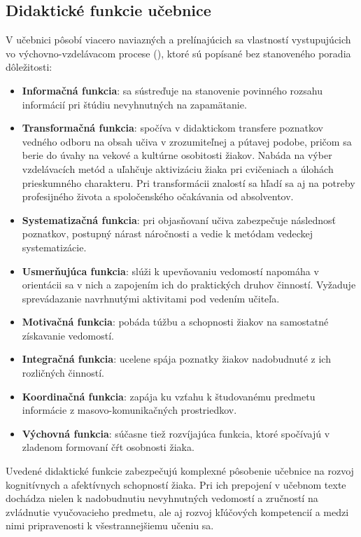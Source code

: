 \subsection{Didaktické funkcie učebnice}
V učebnici pôsobí viacero naviazných a prelínajúcich sa vlastností vystupujúcich vo výchovno-vzdelávacom procese (\cite{zujev_ako_1986}), ktoré sú popísané bez stanoveného poradia dôležitosti:
\begin{itemize}
\itemsep0pt
\item \textbf{Informačná funkcia}: sa sústreďuje na stanovenie povinného rozsahu informácií pri štúdiu nevyhnutných na zapamätanie.
\item \textbf{Transformačná funkcia}: spočíva v didaktickom transfere poznatkov vedného odboru na obsah učiva v zrozumiteľnej a pútavej podobe, pričom sa berie do úvahy na vekové a kultúrne osobitosti žiakov. Nabáda na výber vzdelávacích metód a uľahčuje aktivizáciu žiaka pri cvičeniach a úlohách prieskumného charakteru. Pri transformácii znalostí sa hľadí sa aj na potreby profesijného života a spoločenského očakávania od absolventov.
\item \textbf{Systematizačná funkcia}: pri objasňovaní učiva zabezpečuje následnosť poznatkov, postupný nárast náročnosti a vedie k metódam vedeckej systematizácie.
\item \textbf{Usmerňujúca funkcia}: slúži k upevňovaniu vedomostí napomáha v orientácii sa v nich a zapojením ich do praktických druhov činností. Vyžaduje sprevádazanie navrhnutými aktivitami pod vedením učiteľa.
\item \textbf{Motivačná funkcia}: pobáda túžbu a schopnosti žiakov na samostatné získavanie vedomostí.
\item \textbf{Integračná funkcia}: ucelene spája poznatky žiakov nadobudnuté z ich rozličných činností.
\item \textbf{Koordinačná funkcia}: zapája ku vzťahu k študovanému predmetu informácie z masovo-komunikačných prostriedkov. 
\item \textbf{Výchovná funkcia}: súčasne tiež rozvíjajúca funkcia, ktoré spočívajú v zladenom formovaní čŕt osobnosti žiaka.
\end{itemize}
Uvedené didaktické funkcie zabezpečujú komplexné pôsobenie učebnice na rozvoj kognitívnych a afektívnych schopností žiaka. Pri ich prepojení v učebnom texte dochádza nielen k nadobudnutiu nevyhnutných vedomostí a zručností na zvládnutie vyučovacieho predmetu, ale aj rozvoj kľúčových kompetencií a medzi nimi pripravenosti k všestrannejšiemu učeniu sa.



